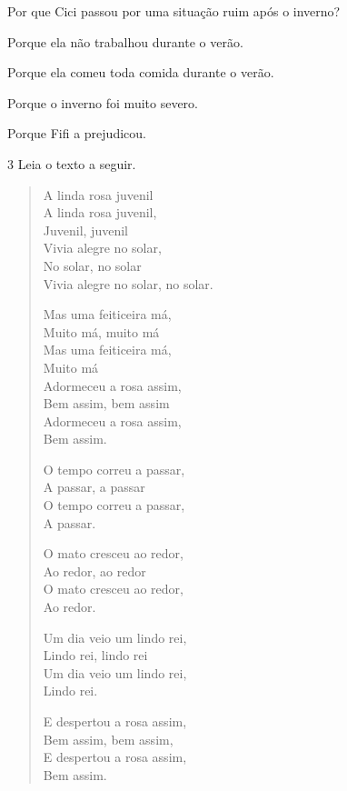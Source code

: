 Por que Cici passou por uma situação ruim após o inverno?

\begin{escolha}
\item Porque ela não trabalhou durante o verão.

\item Porque ela comeu toda comida durante o verão.

\item Porque o inverno foi muito severo.

\item Porque Fifi a prejudicou.
\end{escolha}

\pagebreak
\num{3} Leia o texto a seguir.

\begin{multicols}{2}
\begin{verse}
A linda rosa juvenil\\
A linda rosa juvenil,\\
Juvenil, juvenil\\
Vivia alegre no solar,\\
No solar, no solar\\
Vivia alegre no solar, no solar.

Mas uma feiticeira má,\\
Muito má, muito má\\
Mas uma feiticeira má,\\
Muito má\\
Adormeceu a rosa assim,\\
Bem assim, bem assim\\
Adormeceu a rosa assim,\\
Bem assim.

O tempo correu a passar,\\
A passar, a passar\\
O tempo correu a passar,\\
A passar.

O mato cresceu ao redor,\\
Ao redor, ao redor\\
O mato cresceu ao redor,\\
Ao redor.

Um dia veio um lindo rei,\\
Lindo rei, lindo rei\\
Um dia veio um lindo rei,\\
Lindo rei.

E despertou a rosa assim,\\
Bem assim, bem assim,\\
E despertou a rosa assim,\\
Bem assim.
\end{verse}
\end{multicols}


